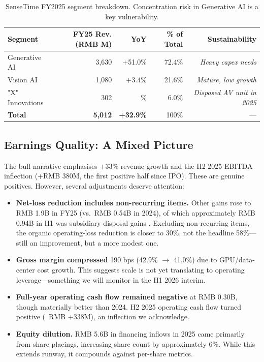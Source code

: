 \documentclass[11pt,a4paper]{article}
\begin{document}
\begin{table}[h]
\centering
\small
\begin{tabular}{lrrrr}
\toprule
\textbf{Segment} & \textbf{FY25 Rev. (RMB M)} & \textbf{YoY} & \textbf{\% of Total} & \textbf{Sustainability} \\
\midrule
Generative AI & 3{,}630 & +51.0\% & 72.4\% & \textit{Heavy capex needs} \\
Vision AI & 1{,}080 & +3.4\% & 21.6\% & \textit{Mature, low growth} \\
"X" Innovations & 302 & \textcolor{ubsred}{\textminus 5.9\%} & 6.0\% & \textit{Disposed AV unit in 2025} \\
\midrule
\textbf{Total} & \textbf{5{,}012} & \textbf{+32.9\%} & 100\% & --- \\
\bottomrule
\end{tabular}
\caption{SenseTime FY2025 segment breakdown. Concentration risk in Generative AI is a key vulnerability.}
\end{table}

\subsection{Earnings Quality: A Mixed Picture}

The bull narrative emphasises +33\% revenue growth and the H2 2025 EBITDA inflection (+RMB 380M, the first positive half since IPO). These are genuine positives. However, several adjustments deserve attention:

\begin{itemize}
\item \textbf{Net-loss reduction includes non-recurring items.} Other gains rose to RMB 1.9B in FY25 (vs.\ RMB 0.54B in 2024), of which approximately RMB 0.94B in H1 was subsidiary disposal gains \cite{krasia2026sensetime}. Excluding non-recurring items, the organic operating-loss reduction is closer to 30\%, not the headline 58\%---still an improvement, but a more modest one.
\item \textbf{Gross margin compressed} 190 bps (42.9\% $\to$ 41.0\%) due to GPU/data-center cost growth. This suggests scale is not yet translating to operating leverage---something we will monitor in the H1 2026 interim.
\item \textbf{Full-year operating cash flow remained negative} at \textminus RMB 0.30B, though materially better than 2024. H2 2025 operating cash flow turned positive (~RMB +338M), an inflection we acknowledge.
\item \textbf{Equity dilution.} RMB 5.6B in financing inflows in 2025 came primarily from share placings, increasing share count by approximately 6\%. While this extends runway, it compounds against per-share metrics.
\end{itemize}
\end{document}
